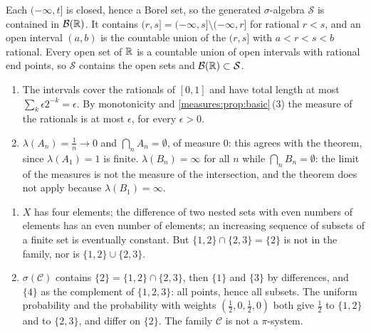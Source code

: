 Each $(-\infty, t]$ is closed, hence a Borel set, so the generated
$\sigma$-algebra $\mathcal S$ is contained in $\mathcal B(\mathbb{R})$. It
contains $(r, s] = (-\infty, s]\setminus(-\infty, r]$ for rational
$r < s$, and an open interval $(a, b)$ is the countable union of the
$(r, s]$ with $a < r < s < b$ rational. Every open set of $\mathbb{R}$ is a
countable union of open intervals with rational end points, so
$\mathcal S$ contains the open sets and
$\mathcal B(\mathbb{R})\subset\mathcal S$.

\begin{enumerate}[nosep]
  \item The intervals cover the rationals of $[0, 1]$ and have total
        length at most $\sum_k\epsilon2^{-k} = \epsilon$. By
        monotonicity and \cref{measures:prop:basic}\,(3) the measure of
        the rationals is at most $\epsilon$, for every $\epsilon > 0$.
  \item $\lambda(A_n) = \frac1n\to0$ and
        $\bigcap_nA_n = \emptyset$, of measure $0$: this agrees with the
        theorem, since $\lambda(A_1) = 1$ is finite.
        $\lambda(B_n) = \infty$ for all $n$ while
        $\bigcap_nB_n = \emptyset$: the limit of the measures is not the
        measure of the intersection, and the theorem does not apply
        because $\lambda(B_1) = \infty$.
\end{enumerate}

\begin{enumerate}[nosep]
  \item $X$ has four elements; the difference of two nested sets with
        even numbers of elements has an even number of elements; an
        increasing sequence of subsets of a finite set is eventually
        constant. But $\{1, 2\}\cap\{2, 3\} = \{2\}$ is not in the
        family, nor is $\{1, 2\}\cup\{2, 3\}$.
  \item $\sigma(\mathcal C)$ contains $\{2\} = \{1, 2\}\cap\{2, 3\}$,
        then $\{1\}$ and $\{3\}$ by differences, and $\{4\}$ as the
        complement of $\{1, 2, 3\}$: all points, hence all subsets. The
        uniform probability and the probability with weights
        $(\frac12, 0, \frac12, 0)$ both give $\frac12$ to $\{1, 2\}$ and
        to $\{2, 3\}$, and differ on $\{2\}$. The family $\mathcal C$ is
        not a $\pi$-system.
\end{enumerate}

